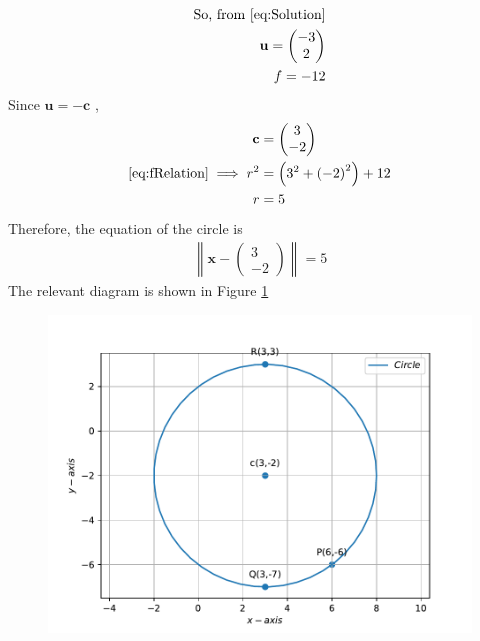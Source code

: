 \documentclass[12pt]{article}
\providecommand{\brak}[1]{\ensuremath{\left(#1\right)}}
\providecommand{\norm}[1]{\left\lVert#1\right\rVert}
\newcommand{\myvec}[1]{\ensuremath{\begin{pmatrix}#1\end{pmatrix}}}
\let\vec\mathbf
\begin{document}
\begin{enumerate}
\begin{align}
	\text{So, from } \eqref{eq:Solution} \\
	\vec{u} = \myvec{-3 \\ 2} \\ 
	f = -12 
\end{align}
Since $\vec{u} = -\vec{c}$ , 
\begin{align}
	\vec{c} &= \myvec{ 3 \\ -2} \\
	\eqref{eq:fRelation} \implies r^2 &= \brak{3^2 + \brak{-2}^2} + 12 \\
	 r &= 5
\end{align}
Therefore, the equation of the circle is 
\begin{align}
	\norm{\vec{x}-\myvec{3 \\ -2}}  = 5 
\end{align}
The relevant diagram is shown in Figure \ref{fig:Fig1}
\begin{figure}[!h]
	\begin{center}
		\includegraphics[width=\columnwidth]{./figs/problem3.pdf}
	\end{center}
\caption{}
\label{fig:Fig1}
\end{figure}
\end{enumerate}
\end{document}
